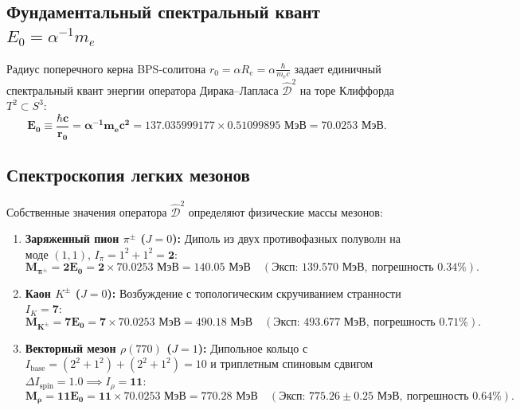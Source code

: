 \documentclass[12pt,a4paper]{article}
\begin{document}
	\subsection{Фундаментальный спектральный квант $E_0 = \alpha^{-1} m_e$}
	Радиус поперечного керна BPS-солитона $r_0 = \alpha R_e = \alpha \frac{\hbar}{m_e c}$ задает единичный спектральный квант энергии оператора Дирака--Лапласа $\hat{\mathcal{D}}^2$ на торе Клиффорда $T^2 \subset S^3$:
	\begin{equation}
		\mathbf{E_0 \equiv \frac{\hbar c}{r_0} = \alpha^{-1} m_e c^2 = 137.035999177 \times 0.51099895 \text{ МэВ} = \mathbf{70.0253 \text{ МэВ}}}.
	\end{equation}
	
	\subsection{Спектроскопия легких мезонов}
	Собственные значения оператора $\hat{\mathcal{D}}^2$ определяют физические массы мезонов:
	\begin{enumerate}
		\item \textbf{Заряженный пион $\pi^\pm$ ($J=0$):} Диполь из двух противофазных полуволн на моде $(1,1)$, $I_\pi = 1^2 + 1^2 = \mathbf{2}$:
		\begin{equation}
			\mathbf{M_{\pi^\pm} = 2 E_0 = 2 \times 70.0253 \text{ МэВ} = \mathbf{140.05 \text{ МэВ}}} \quad (\text{Эксп: } 139.570 \text{ МэВ}, \ \text{погрешность } 0.34\%).
		\end{equation}
		
		\item \textbf{Каон $K^\pm$ ($J=0$):} Возбуждение с топологическим скручиванием странности $I_K = \mathbf{7}$:
		\begin{equation}
			\mathbf{M_{K^\pm} = 7 E_0 = 7 \times 70.0253 \text{ МэВ} = \mathbf{490.18 \text{ МэВ}}} \quad (\text{Эксп: } 493.677 \text{ МэВ}, \ \text{погрешность } 0.71\%).
		\end{equation}
		
		\item \textbf{Векторный мезон $\rho(770)$ ($J=1$):} Дипольное кольцо с $I_{\text{base}} = (2^2+1^2) + (2^2+1^2) = 10$ и триплетным спиновым сдвигом $\Delta I_{\text{spin}} = 1.0 \implies I_\rho = \mathbf{11}$:
		\begin{equation}
			\mathbf{M_\rho = 11 E_0 = 11 \times 70.0253 \text{ МэВ} = \mathbf{770.28 \text{ МэВ}}} \quad (\text{Эксп: } 775.26 \pm 0.25 \text{ МэВ}, \ \text{погрешность } 0.64\%).
		\end{equation}
	\end{enumerate}
	
\end{document}
